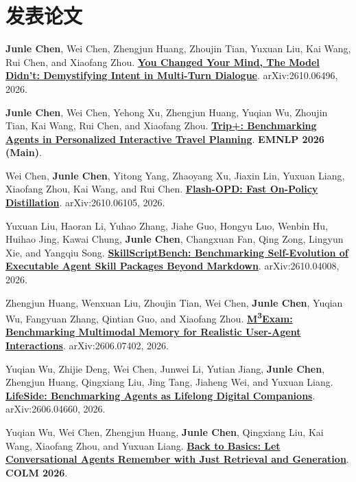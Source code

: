 \documentclass[10pt,a4paper]{article}
\begin{document}
\section*{发表论文}

\begin{enumerate}[label={[\arabic*]},leftmargin=18pt,itemsep=1.2pt,topsep=1pt]
\item \textbf{Junle Chen}, Wei Chen, Zhengjun Huang, Zhoujin Tian, Yuxuan Liu, Kai Wang, Rui Chen, and Xiaofang Zhou. \href{https://arxiv.org/abs/2610.06496v1}{\textbf{You Changed Your Mind, The Model Didn't: Demystifying Intent in Multi-Turn Dialogue}}. arXiv:2610.06496, 2026.
\item \textbf{Junle Chen}, Wei Chen, Yehong Xu, Zhengjun Huang, Yuqian Wu, Zhoujin Tian, Kai Wang, Rui Chen, and Xiaofang Zhou. \href{https://arxiv.org/abs/2606.21169}{\textbf{Trip+: Benchmarking Agents in Personalized Interactive Travel Planning}}. \textbf{EMNLP 2026 (Main)}.
\item Wei Chen, \textbf{Junle Chen}, Yitong Yang, Zhaoyang Xu, Jiaxin Lin, Yuxuan Liang, Xiaofang Zhou, Kai Wang, and Rui Chen. \href{https://arxiv.org/abs/2610.06105}{\textbf{Flash-OPD: Fast On-Policy Distillation}}. arXiv:2610.06105, 2026.
\item Yuxuan Liu, Haoran Li, Yuhao Zhang, Jiahe Guo, Hongyu Luo, Wenbin Hu, Huihao Jing, Kawai Chung, \textbf{Junle Chen}, Changxuan Fan, Qing Zong, Lingyun Xie, and Yangqiu Song. \href{https://arxiv.org/abs/2610.04008}{\textbf{SkillScriptBench: Benchmarking Self-Evolution of Executable Agent Skill Packages Beyond Markdown}}. arXiv:2610.04008, 2026.
\item Zhengjun Huang, Wenxuan Liu, Zhoujin Tian, Wei Chen, \textbf{Junle Chen}, Yuqian Wu, Fangyuan Zhang, Qintian Guo, and Xiaofang Zhou. \href{https://arxiv.org/abs/2606.07402}{\textbf{M\textsuperscript{3}Exam: Benchmarking Multimodal Memory for Realistic User-Agent Interactions}}. arXiv:2606.07402, 2026.
\item Yuqian Wu, Zhijie Deng, Wei Chen, Junwei Li, Yutian Jiang, \textbf{Junle Chen}, Zhengjun Huang, Qingxiang Liu, Jing Tang, Jiaheng Wei, and Yuxuan Liang. \href{https://arxiv.org/abs/2606.04660}{\textbf{LifeSide: Benchmarking Agents as Lifelong Digital Companions}}. arXiv:2606.04660, 2026.
\item Yuqian Wu, Wei Chen, Zhengjun Huang, \textbf{Junle Chen}, Qingxiang Liu, Kai Wang, Xiaofang Zhou, and Yuxuan Liang. \href{https://arxiv.org/abs/2604.11628}{\textbf{Back to Basics: Let Conversational Agents Remember with Just Retrieval and Generation}}. \textbf{COLM 2026}.

\end{enumerate}
\end{document}
